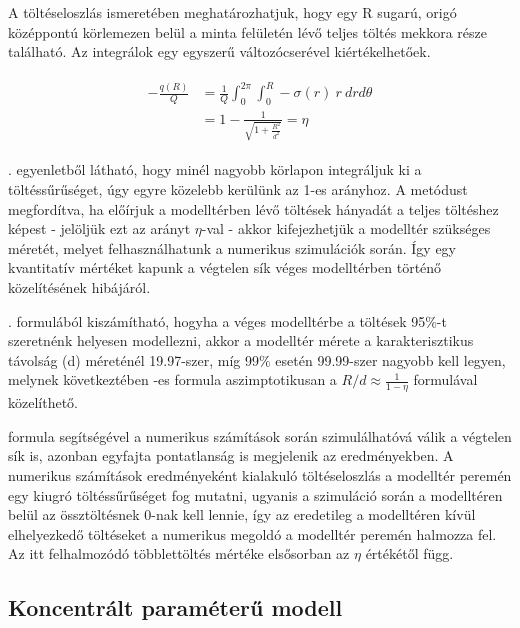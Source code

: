A töltéseloszlás ismeretében meghatározhatjuk, hogy egy R sugarú, origó középpontú körlemezen belül a minta felületén lévő teljes töltés mekkora része található. Az integrálok egy egyszerű változócserével kiértékelhetőek.

\begin{align}
    \label{eqn:partial_q}
    \begin{split}
        -\frac{q(R)}{Q} &= \frac{1}{Q}\int_0^{2\pi}\int_0^R -\sigma(r)\ r\ dr d\theta\\
        &= 1-\frac{1}{\sqrt{1+\frac{R^2}{d^2}}} = \eta
    \end{split}
\end{align}

. egyenletből látható, hogy minél nagyobb körlapon integráljuk ki a töltéssűrűséget, úgy egyre közelebb kerülünk az 1-es arányhoz. A metódust megfordítva, ha előírjuk a modelltérben lévő töltések hányadát a teljes töltéshez képest - jelöljük ezt az arányt $\eta$-val - akkor kifejezhetjük a modelltér szükséges méretét, melyet felhasználhatunk a numerikus szimulációk során. Így egy kvantitatív mértéket kapunk a végtelen sík véges modelltérben történő közelítésének hibájáról.


. formulából kiszámítható, hogyha a véges modelltérbe a töltések 95$\%$-t szeretnénk helyesen modellezni, akkor a modelltér mérete a karakterisztikus távolság (d) méreténél 19.97-szer, míg 99$\%$ esetén 99.99-szer nagyobb kell legyen, melynek következtében -es formula aszimptotikusan a $R/d \approx \frac{1}{1-\eta}$ formulával közelíthető.

 formula segítségével a numerikus számítások során szimulálhatóvá válik a végtelen sík is, azonban egyfajta pontatlanság is megjelenik az eredményekben. A numerikus számítások eredményeként kialakuló töltéseloszlás a modelltér peremén egy kiugró töltéssűrűséget fog mutatni, ugyanis a szimuláció során a modelltéren belül az össztöltésnek 0-nak kell lennie, így az eredetileg a modelltéren kívül elhelyezkedő töltéseket a numerikus megoldó a modelltér peremén halmozza fel. Az itt felhalmozódó többlettöltés mértéke elsősorban az $\eta$ értékétől függ.

\subsection{Koncentrált paraméterű modell}

